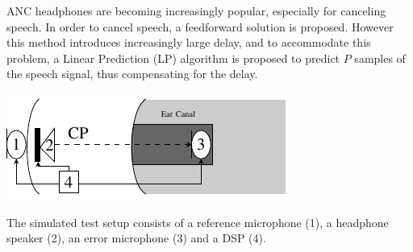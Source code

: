 \large




 ANC headphones are becoming increasingly popular, especially for canceling speech. 
 In order to cancel speech, a feedforward solution is proposed.
 However this method introduces increasingly large delay, and to accommodate this problem, a Linear Prediction (LP) algorithm is proposed to predict $P$ samples
 of the speech signal, thus compensating for the delay.


\begin{centering}
	\includegraphics[width=\textwidth]{figures/BasicOverviewZoomed.pdf}
\end{centering}
The simulated test setup consists of a reference microphone (1), a headphone speaker (2), an error microphone (3) and a DSP (4). 